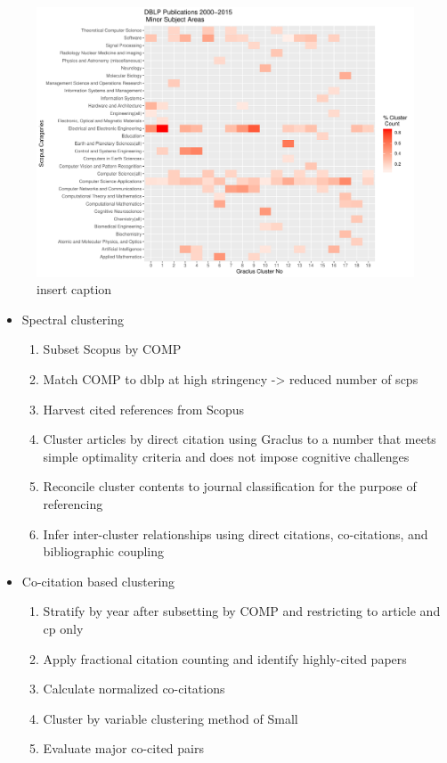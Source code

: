 \begin{figure}[ht]
  \includegraphics[scale=0.5]{scopus_dblp_graclus2.pdf}
\caption{insert caption}
\label{heatmap}       %
\end{figure}

\begin{itemize}
\item Spectral clustering
\begin{enumerate}
\item Subset Scopus by COMP
\item Match COMP to dblp at high stringency -> reduced number of scps
 \item Harvest cited references  from Scopus
 \item Cluster articles by direct citation using Graclus to a number that meets simple optimality criteria and does not impose cognitive challenges
 \item Reconcile cluster contents to journal classification for the purpose of referencing
 \item Infer inter-cluster relationships using direct citations, co-citations, and bibliographic coupling
\end{enumerate}
\item Co-citation based clustering
\begin{enumerate}
\item Stratify by year after subsetting by COMP and restricting to article and cp only
\item Apply fractional citation counting and identify highly-cited papers
\item Calculate normalized co-citations
\item Cluster by variable clustering method of Small
\item Evaluate major co-cited pairs
\end{enumerate}
\end{itemize}


